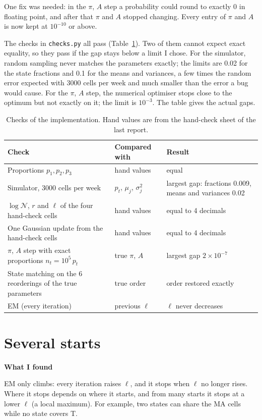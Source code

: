 \documentclass[10pt,a4paper]{article}
\newcommand{\sub}[1]{\vspace{1pt}\textbf{\textcolor{gray!80!black}{#1}}\par}
\begin{document}
One fix was needed: in the $\pi$, $A$ step a probability could round to exactly 0 in floating point, and after that $\pi$ and $A$ stopped changing. Every entry of $\pi$ and $A$ is now kept at $10^{-10}$ or above.

The checks in \texttt{checks.py} all pass (Table~\ref{tab:checks}). Two of them cannot expect exact equality, so they pass if the gap stays below a limit I chose. For the simulator, random sampling never matches the parameters exactly; the limits are 0.02 for the state fractions and 0.1 for the means and variances, a few times the random error expected with 3000 cells per week and much smaller than the error a bug would cause. For the $\pi$, $A$ step, the numerical optimiser stops close to the optimum but not exactly on it; the limit is $10^{-3}$. The table gives the actual gaps.

\begin{table}[!htb]
\centering
\small
\begin{tabular}{@{}lll@{}}
\toprule
Check & Compared with & Result \\
\midrule
Proportions $p_1, p_2, p_3$ & hand values & equal \\
Simulator, 3000 cells per week & $p_t$, $\mu_j$, $\sigma^2_j$ & largest gap: fractions 0.009, means and variances 0.02 \\
$\log \mathcal{N}$, $r$ and $\ell$ of the four hand-check cells & hand values & equal to 4 decimals \\
One Gaussian update from the hand-check cells & hand values & equal to 4 decimals \\
$\pi$, $A$ step with exact proportions $n_t = 10^5\, p_t$ & true $\pi$, $A$ & largest gap $2 \times 10^{-7}$ \\
State matching on the 6 reorderings of the true parameters & true order & order restored exactly \\
EM (every iteration) & previous $\ell$ & $\ell$ never decreases \\
\bottomrule
\end{tabular}
\caption{Checks of the implementation. Hand values are from the hand-check sheet of the last report.}
\label{tab:checks}
\end{table}

\section{Several starts}

\sub{What I found}
EM only climbs: every iteration raises $\ell$, and it stops when $\ell$ no longer rises. Where it stops depends on where it starts, and from many starts it stops at a lower $\ell$ (a local maximum). For example, two states can share the MA cells while no state covers T.
\end{document}
